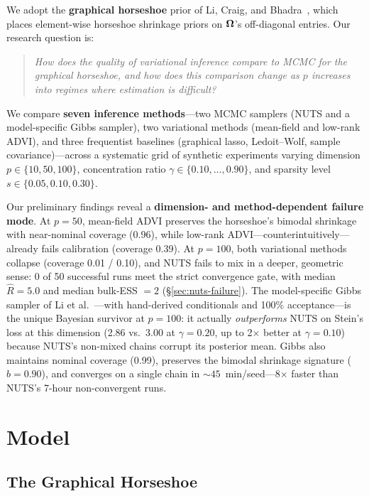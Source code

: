 \documentclass[10pt,conference,compsoc]{IEEEtran}
\begin{document}
We adopt the \textbf{graphical horseshoe} prior of Li, Craig, and Bhadra~\cite{li2019}, which places element-wise horseshoe shrinkage priors on $\bm{\Omega}$'s off-diagonal entries. Our research question is:
\begin{quote}
\textit{How does the quality of variational inference compare to MCMC for the graphical horseshoe, and how does this comparison change as $p$ increases into regimes where estimation is difficult?}
\end{quote}

We compare \textbf{seven inference methods}---two MCMC samplers (NUTS and a model-specific Gibbs sampler), two variational methods (mean-field and low-rank ADVI), and three frequentist baselines (graphical lasso, Ledoit--Wolf, sample covariance)---across a systematic grid of synthetic experiments varying dimension $p \in \{10, 50, 100\}$, concentration ratio $\gamma \in \{0.10, \ldots, 0.90\}$, and sparsity level $s \in \{0.05, 0.10, 0.30\}$.

Our preliminary findings reveal a \textbf{dimension- and method-dependent failure mode}. At $p{=}50$, mean-field ADVI preserves the horseshoe's bimodal shrinkage with near-nominal coverage (0.96), while low-rank ADVI---counterintuitively---already fails calibration (coverage 0.39). At $p{=}100$, both variational methods collapse (coverage 0.01 / 0.10), and NUTS fails to mix in a deeper, geometric sense: 0 of 50 successful runs meet the strict convergence gate, with median $\hat{R} = 5.0$ and median bulk-ESS $= 2$ (\S\ref{sec:nuts-failure}). The model-specific Gibbs sampler of Li et al.~\cite{li2019}---with hand-derived conditionals and 100\% acceptance---is the unique Bayesian survivor at $p{=}100$: it actually \emph{outperforms} NUTS on Stein's loss at this dimension (2.86 vs.\ 3.00 at $\gamma{=}0.20$, up to 2$\times$ better at $\gamma{=}0.10$) because NUTS's non-mixed chains corrupt its posterior mean. Gibbs also maintains nominal coverage (0.99), preserves the bimodal shrinkage signature ($b = 0.90$), and converges on a single chain in ${\sim}45$~min/seed---8$\times$ faster than NUTS's 7-hour non-convergent runs.

\section{Model}

\subsection{The Graphical Horseshoe}
\end{document}
